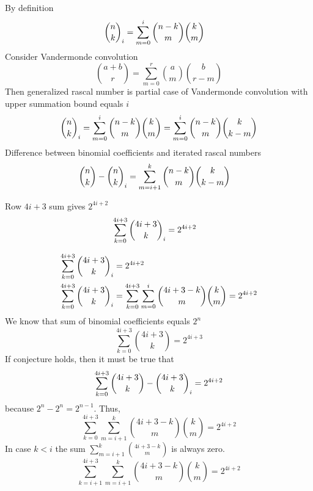 By definition
\begin{align}
    \binom{n}{k}_{i} &= \sum_{m=0}^{i} \binom{n-k}{m} \binom{k}{m}
\end{align}
Consider Vandermonde convolution
\begin{equation*}
    \binom{a+b}{r} = \sum_{m=0}^{r} \binom{a}{m} \binom{b}{r-m}
\end{equation*}
Then generalized rascal number is partial case of Vandermonde convolution with upper summation bound equals $i$
\begin{equation*}
    \binom{n}{k}_{i} = \sum_{m=0}^{i} \binom{n-k}{m} \binom{k}{m} = \sum_{m=0}^{i} \binom{n-k}{m} \binom{k}{k-m}
\end{equation*}
Difference between binomial coefficients and iterated rascal numbers
\begin{align*}
    \binom{n}{k} - \binom{n}{k}_{i} &= \sum_{m=i+1}^{k} \binom{n-k}{m} \binom{k}{k-m}
\end{align*}
\begin{proposition}
    Row $4i+3$ sum gives $2^{4i+2}$
    \begin{align*}
        \sum_{k=0}^{4i+3} \binom{4i+3}{k}_{i} &= 2^{4i+2}
    \end{align*}
\end{proposition}
\begin{align*}
    \sum_{k=0}^{4i+3} \binom{4i+3}{k}_{i} &= 2^{4i+2} \\
    \sum_{k=0}^{4i+3} \binom{4i+3}{k}_{i} &= \sum_{k=0}^{4i+3} \sum_{m=0}^{i} \binom{4i+3-k}{m} \binom{k}{m} = 2^{4i+2}
\end{align*}
We know that sum of binomial coefficients equals $2^n$
\begin{equation*}
    \sum_{k=0}^{4i+3} \binom{4i+3}{k}  = 2^{4i+3}
\end{equation*}
If conjecture holds, then it must be true that
\begin{equation*}
    \sum_{k=0}^{4i+3} \binom{4i+3}{k} - \binom{4i+3}{k}_{i} = 2^{4i+2}
\end{equation*}
because $2^n - 2^n = 2^{n-1}$.
Thus,
\begin{equation*}
    \sum_{k=0}^{4i+3} \sum_{m=i+1}^{k} \binom{4i+3-k}{m} \binom{k}{m} = 2^{4i+2}
\end{equation*}
In case $k<i$ the sum $\sum_{m=i+1}^{k} \binom{4i+3-k}{m}$ is always zero.
\begin{equation*}
    \sum_{k=i+1}^{4i+3} \sum_{m=i+1}^{k} \binom{4i+3-k}{m} \binom{k}{m} = 2^{4i+2}
\end{equation*}

